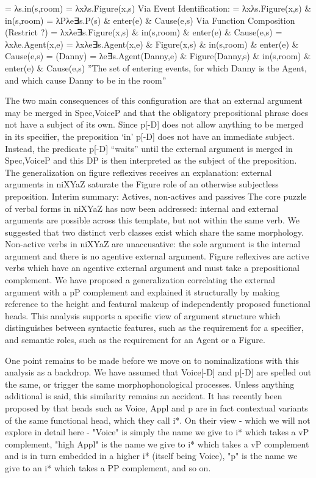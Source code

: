 = λs.in(s,room)
         = λxλs.Figure(x,s)
        Via Event Identification:
         = λxλs.Figure(x,s) \& in(s,room) 
         = λPλe∃s.P(s) \& enter(e) \& Cause(e,s)
    Via Function Composition (Restrict \cite{chungladusaw04}?)
            = λxλe∃s.Figure(x,s) \& in(s,room) \& enter(e) \& Cause(e,s)
         = λxλe.Agent(x,e)
        = λxλe∃s.Agent(x,e) \& Figure(x,s) \& in(s,room) \& enter(e) \& Cause(e,s)
         = (Danny) = 
        λe∃s.Agent(Danny,e) \& Figure(Danny,s) \& in(s,room) \& enter(e) \& Cause(e,s) 
        ''The set of entering events, for which Danny is the Agent, and which cause Danny to be in the room''

The two main consequences of this configuration are that an external argument may be merged in Spec,VoiceP and that the obligatory prepositional phrase does not have a subject of its own. Since p[-D] does not allow anything to be merged in its specifier, the preposition ‘in’ p[-D] does not have an immediate subject. Instead, the predicate p[-D] “waits” until the external argument is merged in Spec,VoiceP and this DP is then interpreted as the subject of the preposition. The generalization on figure reflexives receives an explanation: external arguments in niXYaZ saturate the Figure role of an otherwise subjectless preposition.
Interim summary: Actives, non-actives and passives
The core puzzle of verbal forms in niXYaZ has now been addressed: internal and external arguments are possible across this template, but not within the same verb. We suggested that two distinct verb classes exist which share the same morphology. Non-active verbs in niXYaZ are unaccusative: the sole argument is the internal argument and there is no agentive external argument. Figure reflexives are active verbs which have an agentive external argument and must take a prepositional complement. We have proposed a generalization correlating the external argument with a pP complement and explained it structurally by making reference to the height and featural makeup of independently proposed functional heads. This analysis supports a specific view of argument structure which distinguishes between syntactic features, such as the requirement for a specifier, and semantic roles, such as the requirement for an Agent or a Figure.

One point remains to be made before we move on to nominalizations with this analysis as a backdrop. We have assumed that Voice[-D] and p[-D] are spelled out the same, or trigger the same morphophonological processes. Unless anything additional is said, this similarity remains an accident. It has recently been proposed by \cite{woodmarantz17} that heads such as Voice, Appl and p are in fact contextual variants of the same functional head, which they call i*. On their view - which we will not explore in detail here - "Voice" is simply the name we give to i* which takes a vP complement, "high Appl" is the name we give to i* which takes a vP complement and is in turn embedded in a higher i* (itself being Voice), "p" is the name we give to an i* which takes a PP complement, and so on.

